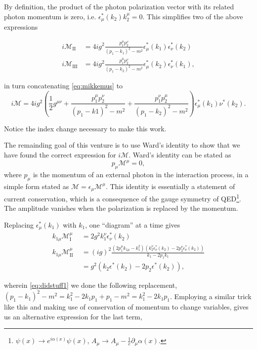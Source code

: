 \documentclass[11pt, a4paper]{amsart}
\begin{document}
By definition, the product of the photon polarization vector with its related photon momentum is zero, i.e. $\epsilon_\mu^*(k_2)k_2^\mu = 0$. This simplifies two of the above expressions

\begin{align}
i\mathcal{M}_{\text{II}} \ &= 4ig^2 \frac{p_1^\mu p_2^\nu}{(p_1 - k_1)^2 - m^2}\epsilon_\mu^*(k_1) \epsilon_\nu^*(k_2) \\
i\mathcal{M}_{\text{III}}  &= 4ig^2 \frac{p_1^\mu p_2^\nu}{(p_1 - k_2)^2 - m^2}\epsilon_\mu^*(k_2) \epsilon_\nu^*(k_1),
\end{align}

in turn concatenating \autoref{eq:mikkemus} to 
\begin{equation}
i\mathcal{M} = 4ig^2 \left(\frac{1}{2}g^{\mu\nu} + \frac{p_1^\mu p_2^\nu}{(p_1 - k1)^2 - m^2} + \frac{p_1^\nu p_2^\mu}{(p_1- k_2)^2 - m^2} \right) \epsilon_\mu^*(k_1) \nu^*(k_2). 
\end{equation}

Notice the index change necessary to make this work.

The remainding goal of this venture is to use Ward's identity to show that we have found the correct expression for $i\mathcal{M}$. Ward's identity can be stated as 
\begin{equation}
p_\mu \mathcal{M}^\mu = 0,
\end{equation}
where $p_\mu$ is the momentum of an external photon in the interaction process, in a simple form stated as $\mathcal{M} = \epsilon_\mu \mathcal{M}^\mu$. This identity is essentially a statement of current conservation, which is a consequence of the gauge symmetry of QED\footnote{$\psi(x) \to e^{i\alpha(x)}\psi(x)$, $A_\mu \to A_\mu - \frac{1}{e}\partial_\mu \alpha(x)$.}. The amplitude vanishes when the polarization is replaced by the momentum.

Replacing $\epsilon_\mu^*(k_1)$ with $k_1$, one ``diagram'' at a time gives
\begin{align}
k_{1\mu}\mathcal{M}_{\text{I}}^\mu \ \ &= 2g^2k_1^\nu\epsilon_\nu^*(k_2) \\
k_{1\mu}\mathcal{M}_{\text{II}}^\mu \  &= (ig)^2\frac{(2p_1^\mu k_{1\mu} - k_1^2)(k_2^\nu\epsilon_\nu^*(k_2) - 2p_2^\nu\epsilon_\nu^*(k_2))}{k_1 - 2p_1k_1} \label{eq:didstuff1} \\
 &= g^2(k_2\epsilon^*(k_2) - 2p_2\epsilon^*(k_2)) \nonumber,
\end{align}

wherein \autoref{eq:didstuff1} we done the following replacement, $(p_1 - k_1)^2 - m^2 = k_1^2 - 2k_1p_1 + p_1 - m^2 = k_1^2 - 2k_1p_1$. Employing a similar trick like this and making use of conservation of momentum to change variables, gives us an alternative expression for the last term,
\end{document}
